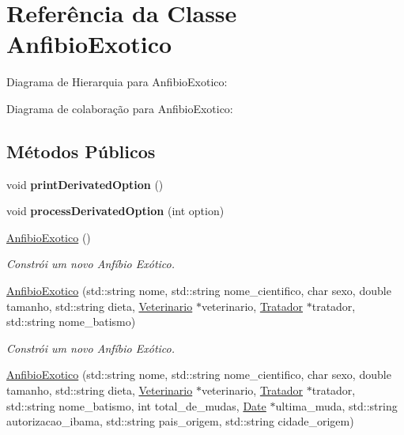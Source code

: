 \hypertarget{classAnfibioExotico}{}\section{Referência da Classe Anfibio\+Exotico}
\label{classAnfibioExotico}


Diagrama de Hierarquia para Anfibio\+Exotico\+:


Diagrama de colaboração para Anfibio\+Exotico\+:
\subsection*{Métodos Públicos}
\begin{DoxyCompactItemize}
\item 
\mbox{\label{classAnfibioExotico_a6faca7e6fb1765e47511a4b6603622fa}} 
void {\bfseries print\+Derivated\+Option} ()
\item 
\mbox{\label{classAnfibioExotico_a7792f89b55c914a526005f75c695887f}} 
void {\bfseries process\+Derivated\+Option} (int option)
\item 
\mbox{\label{classAnfibioExotico_a6f62d4cbdc244038c3b108a7fbfb818d}} 
\hyperlink{classAnfibioExotico_a6f62d4cbdc244038c3b108a7fbfb818d}{Anfibio\+Exotico} ()
\begin{DoxyCompactList}\small\item\em Constrói um novo Anfíbio Exótico. \end{DoxyCompactList}\item 
\hyperlink{classAnfibioExotico_a9c6535c2c202776c0837e4b917589dd6}{Anfibio\+Exotico} (std\+::string nome, std\+::string nome\+\_\+cientifico, char sexo, double tamanho, std\+::string dieta, \hyperlink{classVeterinario}{Veterinario} $\ast$veterinario, \hyperlink{classTratador}{Tratador} $\ast$tratador, std\+::string nome\+\_\+batismo)
\begin{DoxyCompactList}\small\item\em Constrói um novo Anfíbio Exótico. \end{DoxyCompactList}\item 
\hyperlink{classAnfibioExotico_af2c161ad2a2c768aa2636a8f4dfdd707}{Anfibio\+Exotico} (std\+::string nome, std\+::string nome\+\_\+cientifico, char sexo, double tamanho, std\+::string dieta, \hyperlink{classVeterinario}{Veterinario} $\ast$veterinario, \hyperlink{classTratador}{Tratador} $\ast$tratador, std\+::string nome\+\_\+batismo, int total\+\_\+de\+\_\+mudas, \hyperlink{classDate}{Date} $\ast$ultima\+\_\+muda, std\+::string autorizacao\+\_\+ibama, std\+::string pais\+\_\+origem, std\+::string cidade\+\_\+origem)

\end{DoxyCompactItemize}
